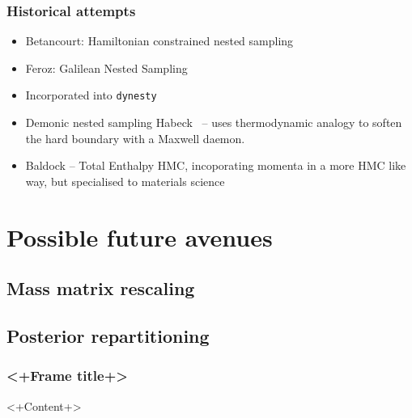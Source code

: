 \documentclass[aspectratio=169]{beamer}
\begin{document}
\begin{frame}
    \frametitle{Historical attempts}
    \begin{itemize}
        \item Betancourt: Hamiltonian constrained nested sampling~
        \item Feroz: Galilean Nested Sampling~
        \item Incorporated into \texttt{dynesty}~
        \item Demonic nested sampling Habeck~ -- uses thermodynamic analogy to soften the hard boundary with a Maxwell daemon.
        \item Baldock  -- Total Enthalpy HMC, incoporating momenta in a more HMC like way, but specialised to materials science
    \end{itemize}
\end{frame}

\section{Possible future avenues}
\subsection{Mass matrix rescaling}
\subsection{Posterior repartitioning}

\begin{frame}
    \frametitle{<+Frame title+>}
    <+Content+>
\end{frame}
\end{document}

